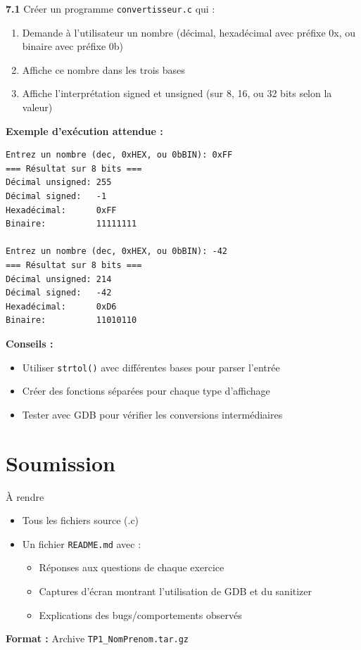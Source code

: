 \documentclass[10pt,a4paper]{article}
\begin{document}
\textbf{7.1} Créer un programme \texttt{convertisseur.c} qui :

\begin{enumerate}
    \item Demande à l'utilisateur un nombre (décimal, hexadécimal avec préfixe 0x, ou binaire avec préfixe 0b)
    \item Affiche ce nombre dans les trois bases
    \item Affiche l'interprétation signed et unsigned (sur 8, 16, ou 32 bits selon la valeur)
\end{enumerate}

\textbf{Exemple d'exécution attendue :}
\begin{verbatim}
Entrez un nombre (dec, 0xHEX, ou 0bBIN): 0xFF
=== Résultat sur 8 bits ===
Décimal unsigned: 255
Décimal signed:   -1
Hexadécimal:      0xFF
Binaire:          11111111

Entrez un nombre (dec, 0xHEX, ou 0bBIN): -42
=== Résultat sur 8 bits ===
Décimal unsigned: 214
Décimal signed:   -42
Hexadécimal:      0xD6
Binaire:          11010110
\end{verbatim}

\textbf{Conseils :}
\begin{itemize}
    \item Utiliser \texttt{strtol()} avec différentes bases pour parser l'entrée
    \item Créer des fonctions séparées pour chaque type d'affichage
    \item Tester avec GDB pour vérifier les conversions intermédiaires
\end{itemize}

\section{Soumission}

\begin{infobox}{À rendre}
\begin{itemize}
    \item Tous les fichiers source (.c)
    \item Un fichier \texttt{README.md} avec :
    \begin{itemize}
        \item Réponses aux questions de chaque exercice
        \item Captures d'écran montrant l'utilisation de GDB et du sanitizer
        \item Explications des bugs/comportements observés
    \end{itemize}
\end{itemize}

\textbf{Format :} Archive \texttt{TP1\_NomPrenom.tar.gz}
\end{infobox}
\end{document}
